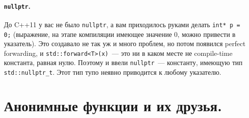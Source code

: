 \documentclass{article}
\begin{document}
    \paragraph{\texttt{nullptr}.}
    До C++11 у вас не было \texttt{nullptr}, а вам приходилось руками делать \texttt{int* p = 0;} (выражение, на этапе компиляции имеющее значение 0, можно привести в указатель). Это создавало не так уж и много проблем, но потом появился perfect forwarding, и \texttt{std::forward<T>(x)}~--- это ни в каком месте не compile-time константа, равная нулю. Поэтому и ввели \texttt{nullptr}~--- константу, имеющую тип \texttt{std::nullptr_t}. Этот тип тупо неявно приводится к любому указателю.
    \section{Анонимные функции и их друзья.}
\end{document}
